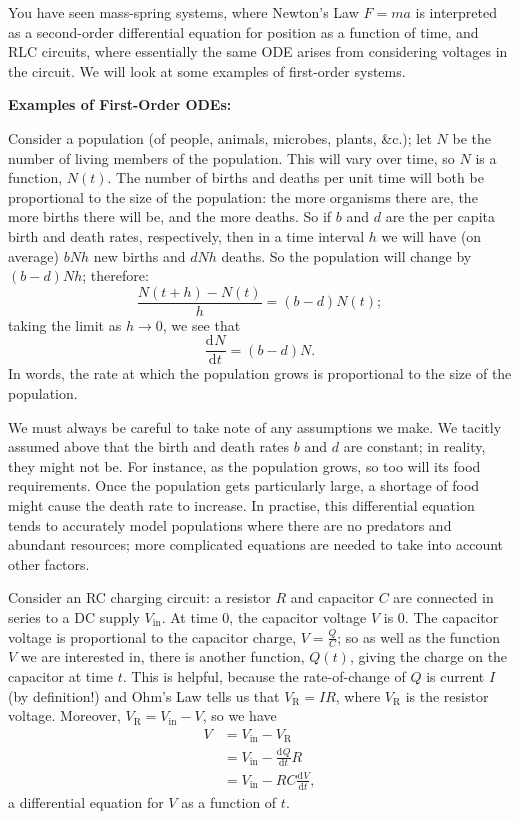 \documentclass{article}
\newcommand{\deriv}[3][]{\frac{\mathrm{d}^{#1}#2}{\mathrm{d}#3^{#1}}}
\begin{document}
You have seen mass-spring systems, where Newton's Law $F=ma$ is interpreted as a second-order differential equation for position as a function of time, and RLC circuits, where essentially the same ODE arises from considering voltages in the circuit. We will look at some examples of first-order systems.

\clearpage






\textbf{Examples of First-Order ODEs:}\bigskip

Consider a population (of people, animals, microbes, plants, \&c.); let $N$ be the number of living members of the population. This will vary over time, so $N$ is a function, $N(t)$. The number of births and deaths per unit time will both be proportional to the size of the population: the more organisms there are, the more births there will be, and the more deaths. So if $b$ and $d$ are the per capita birth and death rates, respectively, then in a time interval $h$ we will have (on average) $bNh$ new births and $dNh$ deaths. So the population will change by $(b-d)Nh$; therefore:
\[\frac{N(t+h)-N(t)}{h}=(b-d)N(t);\]
taking the limit as $h\to 0$, we see that
\[\deriv{N}{t}=(b-d)N.\]
In words, the rate at which the population grows is proportional to the size of the population.

We must always be careful to take note of any assumptions we make. We tacitly assumed above that the birth and death rates $b$ and $d$ are constant; in reality, they might not be. For instance, as the population grows, so too will its food requirements. Once the population gets particularly large, a shortage of food might cause the death rate to increase. In practise, this differential equation tends to accurately model populations where there are no predators and abundant resources; more complicated equations are needed to take into account other factors.\bigskip



Consider an RC charging circuit: a resistor $R$ and capacitor $C$ are connected in series to a DC supply $V_\mathrm{in}$. At time 0, the capacitor voltage $V$ is 0. The capacitor voltage is proportional to the capacitor charge, $V=\frac{Q}{C}$; so as well as the function $V$ we are interested in, there is another function, $Q(t)$, giving the charge on the capacitor at time $t$. This is helpful, because the rate-of-change of $Q$ is current $I$ (by definition!) and Ohm's Law tells us that $V_\mathrm{R}=IR$, where $V_\mathrm{R}$ is the resistor voltage. Moreover, $V_\mathrm{R}=V_\mathrm{in}-V$, so we have
\begin{align*}
	V&=V_\mathrm{in}-V_\mathrm{R}\\
	&=V_\mathrm{in}-\deriv{Q}{t}R\\
	&=V_\mathrm{in} - RC\deriv{V}{t},
\end{align*}
a differential equation for $V$ as a function of $t$.
\end{document}
